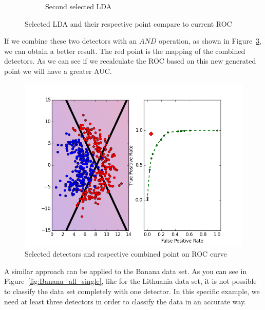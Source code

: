 \begin{figure}[H]
\begin{adjustbox}{minipage=\linewidth,scale=1.1}
\begin{subfigure}[b]{0.5\columnwidth}
        \caption{Second selected LDA}
        \label{fig:Dataset_ROC_Lithuanian_b}
    \end{subfigure}
    \caption{Selected LDA and their respective point compare to current ROC}
    \label{fig:Dataset_ROC_Lithuanian}
    \end{adjustbox}
\end{figure}

If we combine these two detectors with an $AND$ operation,  as shown in Figure~\ref{fig::combined_lithuanian_roc},  we can obtain a better result. The  red point is the mapping of the combined detectors. As we can see if we recalculate the ROC based on this new generated point we will have a greater AUC.

\begin{figure}[H]
\centering
\includegraphics[scale=0.6]{figs/Lithuanian/9999999-combined_All-Classifiers}
\caption{Selected detectors and respective combined point on ROC curve}
\label{fig::combined_lithuanian_roc}
\end{figure}


A similar approach can be applied to the Banana data set. As you can see in Figure~\ref{fig:Banana_all_single}, like for the Lithuania data set, it is not possible to classify the data set completely with one detector.  In this specific example, we need at least three detectors in order to classify the data in an accurate way. 

